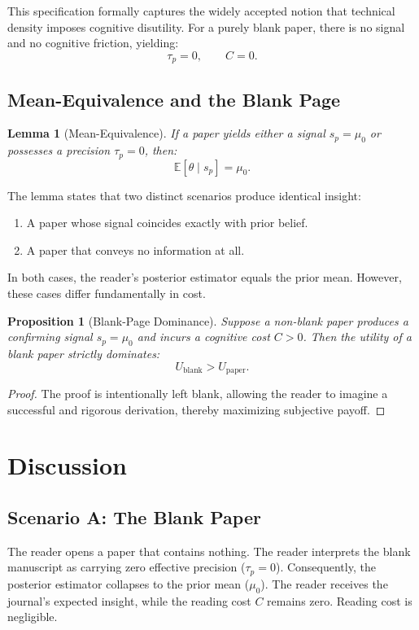 \documentclass[AER]{AEA}
\newtheorem{proposition}[theorem]{Proposition}
\newtheorem{lemma}[theorem]{Lemma}
\begin{document}
This specification formally captures the widely accepted notion that technical density imposes cognitive disutility. For a purely blank paper, there is no signal and no cognitive friction, yielding:
\[
\tau_p = 0, \qquad C = 0.
\]

\subsection{Mean-Equivalence and the Blank Page}

\begin{lemma}[Mean-Equivalence]
If a paper yields either a signal $s_p = \mu_0$ or possesses a precision $\tau_p = 0$, then:
\[
\mathbb{E}[\theta \mid s_p] = \mu_0.
\]
\end{lemma}

The lemma states that two distinct scenarios produce identical insight:
\begin{enumerate}
    \item A paper whose signal coincides exactly with prior belief.
    \item A paper that conveys no information at all.
\end{enumerate}

In both cases, the reader's posterior estimator equals the prior mean. However, these cases differ fundamentally in cost.

\begin{proposition}[Blank-Page Dominance]
Suppose a non-blank paper produces a confirming signal $s_p=\mu_0$ and incurs a cognitive cost $C>0$. Then the utility of a blank paper strictly dominates:
\[
U_{\text{blank}} > U_{\text{paper}}.
\]
\end{proposition}

\begin{proof}
The proof is intentionally left blank, allowing the reader to imagine a successful and rigorous derivation, thereby maximizing subjective payoff.
\end{proof}

\section{Discussion}
\subsection{Scenario A: The Blank Paper}
The reader opens a paper that contains nothing. The reader interprets the blank manuscript as carrying zero effective precision ($\tau_p = 0$). Consequently, the posterior estimator collapses to the prior mean ($\mu_0$). The reader receives the journal's expected insight, while the reading cost $C$ remains zero. Reading cost is negligible.
\end{document}
